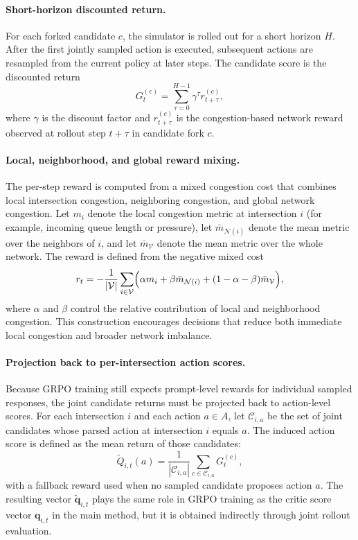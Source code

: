 \paragraph{Short-horizon discounted return.}
For each forked candidate $c$, the simulator is rolled out for a short horizon $H$. After the first jointly sampled action is executed, subsequent actions are resampled from the current policy at later steps. The candidate score is the discounted return
\[
G_t^{(c)} = \sum_{\tau=0}^{H-1} \gamma^\tau r_{t+\tau}^{(c)},
\]
where $\gamma$ is the discount factor and $r_{t+\tau}^{(c)}$ is the congestion-based network reward observed at rollout step $t+\tau$ in candidate fork $c$.

\paragraph{Local, neighborhood, and global reward mixing.}
The per-step reward is computed from a mixed congestion cost that combines local intersection congestion, neighboring congestion, and global network congestion. Let $m_i$ denote the local congestion metric at intersection $i$ (for example, incoming queue length or pressure), let $\bar m_{\mathcal{N}(i)}$ denote the mean metric over the neighbors of $i$, and let $\bar m_{\mathcal{V}}$ denote the mean metric over the whole network. The reward is defined from the negative mixed cost
\[
r_t = - \frac{1}{|\mathcal{V}|} \sum_{i \in \mathcal{V}}
\Bigl(
\alpha m_i
  + \beta \bar m_{\mathcal{N}(i)}
  + (1-\alpha-\beta)\bar m_{\mathcal{V}}
\Bigr),
\]
where $\alpha$ and $\beta$ control the relative contribution of local and neighborhood congestion. This construction encourages decisions that reduce both immediate local congestion and broader network imbalance.

\paragraph{Projection back to per-intersection action scores.}
Because GRPO training still expects prompt-level rewards for individual sampled responses, the joint candidate returns must be projected back to action-level scores. For each intersection $i$ and each action $a \in A$, let $\mathcal{C}_{i,a}$ be the set of joint candidates whose parsed action at intersection $i$ equals $a$. The induced action score is defined as the mean return of those candidates:
\[
\tilde Q_{i,t}(a) =
\frac{1}{|\mathcal{C}_{i,a}|}
\sum_{c \in \mathcal{C}_{i,a}} G_t^{(c)},
\]
with a fallback reward used when no sampled candidate proposes action $a$. The resulting vector $\tilde{\mathbf{q}}_{i,t}$ plays the same role in GRPO training as the critic score vector $\mathbf{q}_{i,t}$ in the main method, but it is obtained indirectly through joint rollout evaluation.

